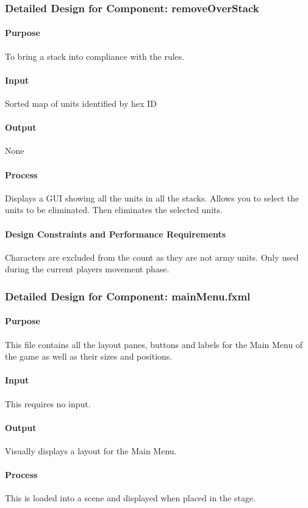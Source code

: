 \documentclass[12pt,a4paper,titlepage]{article}
\begin{document}
\subsubsection{Detailed Design for Component: removeOverStack}
\paragraph{Purpose} To bring a stack into compliance with the rules.
\paragraph{Input} Sorted map of units identified by hex ID
\paragraph{Output} None
\paragraph{Process} Displays a GUI showing all the units in all the stacks. Allows you to select the units to be eliminated. Then eliminates the selected units.
\paragraph{Design Constraints and Performance Requirements} Characters are excluded from the count as they are not army units.  Only used during the current players movement phase.  

\subsubsection{Detailed Design for Component: mainMenu.fxml}
\paragraph{Purpose}  This file contains all the layout panes, buttons and labels for the Main Menu of the game as well as their sizes and positions.
\paragraph{Input} This requires no input.
\paragraph{Output} Visually displays a layout for the Main Menu.
\paragraph{Process} This is loaded into a scene and displayed when placed in the stage.
\end{document}
